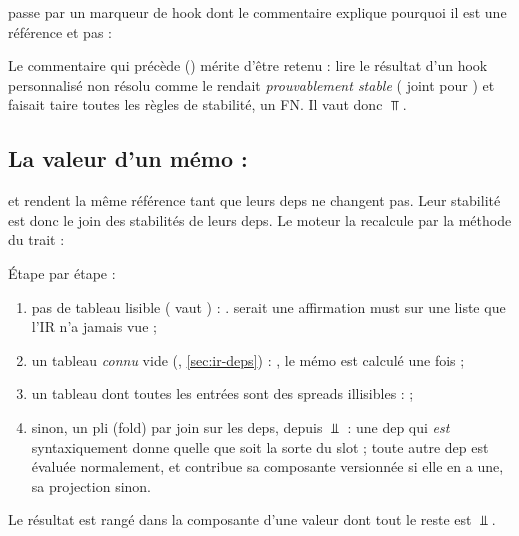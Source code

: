  passe par un marqueur de hook dont le commentaire explique
pourquoi il est une référence et pas  :


Le commentaire qui précède ()
mérite d'être retenu : lire le résultat
d'un hook personnalisé non résolu comme  le rendait
\emph{prouvablement stable} ( joint  pour
) et faisait taire toutes les règles de stabilité, un FN. Il vaut
donc $\Top$.

\subsection{La valeur d'un mémo : }

 et  rendent la même
référence tant que leurs deps ne changent pas. Leur stabilité est donc le
join des stabilités de leurs deps. Le moteur la recalcule par la méthode
 du trait  :


Étape par étape :
\begin{enumerate}
  \item pas de tableau lisible ( vaut ) :
    .  serait une affirmation must sur une liste
    que l'IR n'a jamais vue ;
  \item un tableau \emph{connu} vide (,
    \cref{sec:ir-deps}) : , le mémo est calculé une fois ;
  \item un tableau dont toutes les entrées sont des spreads illisibles :
     ;
  \item sinon, un pli (fold) par join sur les deps, depuis $\Bot$ : une dep
    qui \emph{est} syntaxiquement  donne
     quelle que soit la sorte du slot ;
    toute autre dep est évaluée normalement, et contribue sa composante
    versionnée si elle en a une, sa projection  sinon.
\end{enumerate}
Le résultat est rangé dans la composante  d'une valeur dont
tout le reste est $\Bot$.

